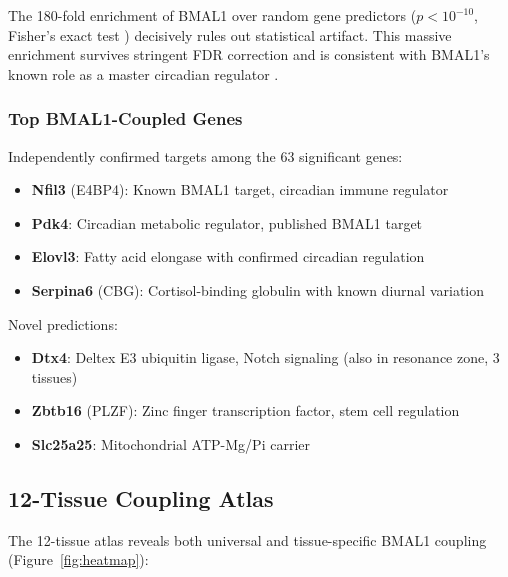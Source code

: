 \documentclass[11pt,letterpaper]{article}
\begin{document}
The 180-fold enrichment of BMAL1 over random gene predictors ($p < 10^{-10}$, Fisher's exact test \citep{fisher1935logic}) decisively rules out statistical artifact. This massive enrichment survives stringent FDR correction \citep{benjamini1995controlling} and is consistent with BMAL1's known role as a master circadian regulator \citep{takahashi2017transcriptional, bunger2000mop3}.

\subsubsection{Top BMAL1-Coupled Genes}

Independently confirmed targets among the 63 significant genes:
\begin{itemize}
\item \textbf{Nfil3} (E4BP4): Known BMAL1 target, circadian immune regulator \citep{mitsui2001antagonistic}
\item \textbf{Pdk4}: Circadian metabolic regulator, published BMAL1 target \citep{nakahata2009circadian}
\item \textbf{Elovl3}: Fatty acid elongase with confirmed circadian regulation \citep{yang2006nuclear}
\item \textbf{Serpina6} (CBG): Cortisol-binding globulin with known diurnal variation
\end{itemize}

Novel predictions:
\begin{itemize}
\item \textbf{Dtx4}: Deltex E3 ubiquitin ligase, Notch signaling (also in resonance zone, 3 tissues)
\item \textbf{Zbtb16} (PLZF): Zinc finger transcription factor, stem cell regulation
\item \textbf{Slc25a25}: Mitochondrial ATP-Mg/Pi carrier
\end{itemize}

\subsection{12-Tissue Coupling Atlas}

The 12-tissue atlas reveals both universal and tissue-specific BMAL1 coupling (Figure~\ref{fig:heatmap}):
\end{document}

